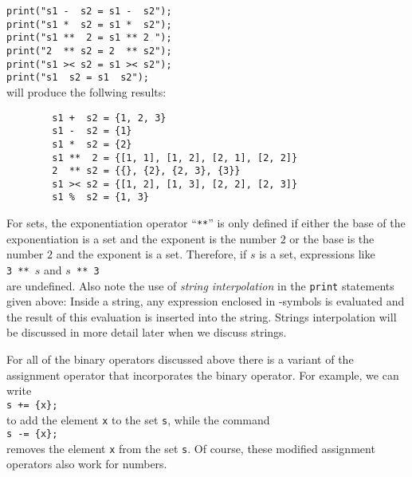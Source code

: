 \texttt{print("s1 - \ s2 = s1 - \ s2");}
\\
\hspace*{1.3cm}
\texttt{print("s1 * \ s2 = s1 * \ s2");}
\\
\hspace*{1.3cm}
\texttt{print("s1 ** \ 2  = s1 ** 2\ ");}
\\
\hspace*{1.3cm}
\texttt{print("2 \ ** s2  = 2 \ ** s2");}
\\
\hspace*{1.3cm}
\texttt{print("s1 >< s2 = s1 >< s2");}
\\
\hspace*{1.3cm}
\texttt{print("s1  \ s2 = s1  \ s2");}
\\[0.2cm]
will produce the follwing results:
\begin{verbatim}
        s1 +  s2 = {1, 2, 3}
        s1 -  s2 = {1}
        s1 *  s2 = {2}
        s1 **  2 = {[1, 1], [1, 2], [2, 1], [2, 2]}
        2  ** s2 = {{}, {2}, {2, 3}, {3}}
        s1 >< s2 = {[1, 2], [1, 3], [2, 2], [2, 3]}
        s1 %  s2 = {1, 3}
\end{verbatim}
For sets, the exponentiation operator ``\texttt{**}'' is only defined if either the base
of the exponentiation is a set and the exponent is the number $2$ or the base is the
number $2$ and the exponent is a set.  Therefore, if $s$ is a set, expressions like
\\[0.2cm]
\hspace*{1.3cm}
\texttt{3 ** $s$} \quad and \quad \texttt{$s$ ** 3}
\\[0.2cm]
are undefined. 
Also note the use of \emph{string interpolation} in the \texttt{print} statements given
above:  Inside a string, any expression enclosed in
-symbols is evaluated and the result of this evaluation is
inserted into the string.
Strings interpolation will be discussed in more detail later when we discuss strings.

For all of the binary operators discussed above there is a variant of
the assignment operator that incorporates the binary operator.  For example, we can write
\\[0.2cm]
\hspace*{1.3cm}
\texttt{s += \{x\};}
\\[0.2cm]
to add the element \texttt{x} to the set \texttt{s}, while the command
\\[0.2cm]
\hspace*{1.3cm}
\texttt{s -= \{x\};}
\\[0.2cm]
removes the element \texttt{x} from the set \texttt{s}.  Of course,
these modified assignment operators also work for numbers.
\vspace*{0.2cm}


